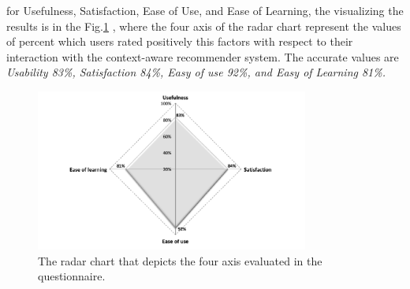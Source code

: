 for Usefulness, Satisfaction, Ease of Use, and Ease of Learning, the
visualizing the results is in the Fig.\ref{fig:radial} , where the
four axis of the radar chart represent the values of percent which
users rated positively this factors with respect to their interaction
with the context-aware recommender system.  The accurate values are
\textit{Usability 83\%, Satisfaction 84\%, Easy of use  92\%, and Easy
of Learning 81\%.}
\begin{figure}
\centering
\small
\captionsetup{font=footnotesize}
\includegraphics[width=0.8\textwidth]{img/radial.png}%
\caption{\small{The radar chart that depicts the four axis 
evaluated in the questionnaire.}}
\label{fig:radial}   
\end{figure}


